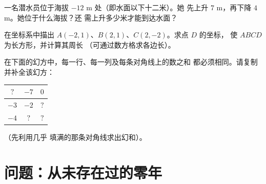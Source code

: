 \begin{exercise}[$\star\star$]\label{exo:g7:negatives:10}
一名潜水员位于海拔 $-12$ m 处（即水面以下十二米）。她
先上升 $7$ m，再下降 $4$ m。她位于什么海拔？还
需上升多少米才能到达水面？
\end{exercise}

\begin{exercise}[$\star\star$]\label{exo:g7:negatives:11}
在坐标系中描出 $A(-2, 1)$、$B(2, 1)$、$C(2, -2)$。求点 $D$ 的坐标，
使 $ABCD$ 为长方形，并计算其周长
（可通过数方格求各边长）。
\end{exercise}

\begin{exercise}[$\star\star\star$]\label{exo:g7:negatives:12}
在下面的幻方中，每一行、每一列及每条对角线上的数之和
都必须相同。请复制并补全该幻方：
\begin{center}
\renewcommand{\arraystretch}{1.4}
\begin{tabular}{|c|c|c|}
\hline
$?$ & $-7$ & $0$ \\
\hline
$-3$ & $-2$ & $?$ \\
\hline
$-4$ & $?$ & $?$ \\
\hline
\end{tabular}
\end{center}
（先利用几乎
填满的那条对角线求出幻和）。
\end{exercise}

\section{问题：从未存在过的零年}

